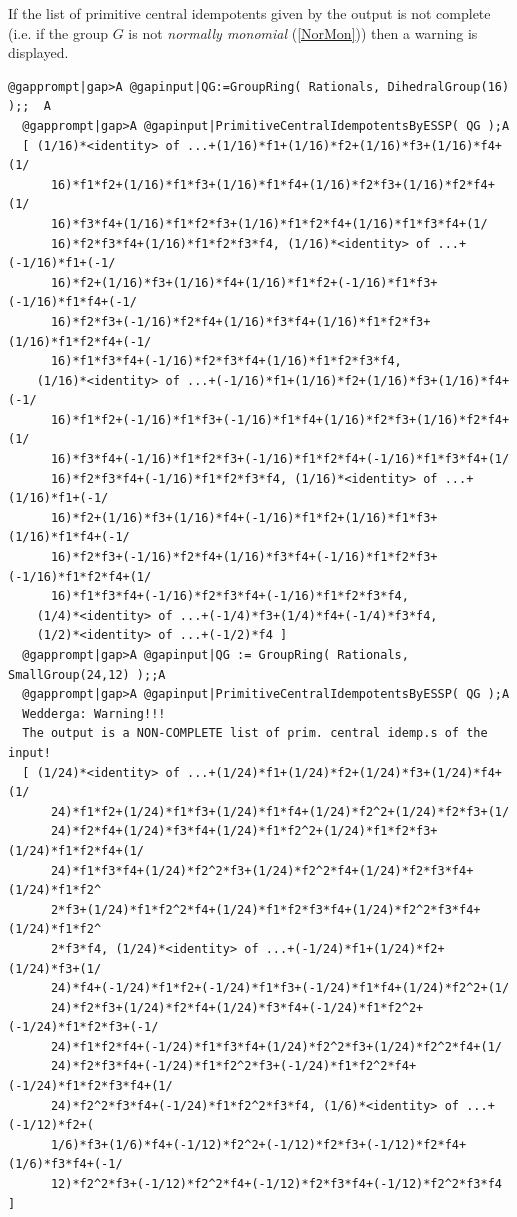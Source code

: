 \documentclass[a4paper,11pt]{report}
\begin{document}
{{{ If the list of primitive central idempotents given by the output is not
complete (i.e. if the group $G$ is not \emph{ normally monomial} (\ref{NorMon})) then a warning is displayed. 
\begin{Verbatim}[commandchars=@|A,fontsize=\small,frame=single,label=Example]
  @gapprompt|gap>A @gapinput|QG:=GroupRing( Rationals, DihedralGroup(16) );;  A
  @gapprompt|gap>A @gapinput|PrimitiveCentralIdempotentsByESSP( QG );A
  [ (1/16)*<identity> of ...+(1/16)*f1+(1/16)*f2+(1/16)*f3+(1/16)*f4+(1/
      16)*f1*f2+(1/16)*f1*f3+(1/16)*f1*f4+(1/16)*f2*f3+(1/16)*f2*f4+(1/
      16)*f3*f4+(1/16)*f1*f2*f3+(1/16)*f1*f2*f4+(1/16)*f1*f3*f4+(1/
      16)*f2*f3*f4+(1/16)*f1*f2*f3*f4, (1/16)*<identity> of ...+(-1/16)*f1+(-1/
      16)*f2+(1/16)*f3+(1/16)*f4+(1/16)*f1*f2+(-1/16)*f1*f3+(-1/16)*f1*f4+(-1/
      16)*f2*f3+(-1/16)*f2*f4+(1/16)*f3*f4+(1/16)*f1*f2*f3+(1/16)*f1*f2*f4+(-1/
      16)*f1*f3*f4+(-1/16)*f2*f3*f4+(1/16)*f1*f2*f3*f4, 
    (1/16)*<identity> of ...+(-1/16)*f1+(1/16)*f2+(1/16)*f3+(1/16)*f4+(-1/
      16)*f1*f2+(-1/16)*f1*f3+(-1/16)*f1*f4+(1/16)*f2*f3+(1/16)*f2*f4+(1/
      16)*f3*f4+(-1/16)*f1*f2*f3+(-1/16)*f1*f2*f4+(-1/16)*f1*f3*f4+(1/
      16)*f2*f3*f4+(-1/16)*f1*f2*f3*f4, (1/16)*<identity> of ...+(1/16)*f1+(-1/
      16)*f2+(1/16)*f3+(1/16)*f4+(-1/16)*f1*f2+(1/16)*f1*f3+(1/16)*f1*f4+(-1/
      16)*f2*f3+(-1/16)*f2*f4+(1/16)*f3*f4+(-1/16)*f1*f2*f3+(-1/16)*f1*f2*f4+(1/
      16)*f1*f3*f4+(-1/16)*f2*f3*f4+(-1/16)*f1*f2*f3*f4, 
    (1/4)*<identity> of ...+(-1/4)*f3+(1/4)*f4+(-1/4)*f3*f4, 
    (1/2)*<identity> of ...+(-1/2)*f4 ]
  @gapprompt|gap>A @gapinput|QG := GroupRing( Rationals, SmallGroup(24,12) );;A
  @gapprompt|gap>A @gapinput|PrimitiveCentralIdempotentsByESSP( QG );A
  Wedderga: Warning!!!
  The output is a NON-COMPLETE list of prim. central idemp.s of the input! 
  [ (1/24)*<identity> of ...+(1/24)*f1+(1/24)*f2+(1/24)*f3+(1/24)*f4+(1/
      24)*f1*f2+(1/24)*f1*f3+(1/24)*f1*f4+(1/24)*f2^2+(1/24)*f2*f3+(1/
      24)*f2*f4+(1/24)*f3*f4+(1/24)*f1*f2^2+(1/24)*f1*f2*f3+(1/24)*f1*f2*f4+(1/
      24)*f1*f3*f4+(1/24)*f2^2*f3+(1/24)*f2^2*f4+(1/24)*f2*f3*f4+(1/24)*f1*f2^
      2*f3+(1/24)*f1*f2^2*f4+(1/24)*f1*f2*f3*f4+(1/24)*f2^2*f3*f4+(1/24)*f1*f2^
      2*f3*f4, (1/24)*<identity> of ...+(-1/24)*f1+(1/24)*f2+(1/24)*f3+(1/
      24)*f4+(-1/24)*f1*f2+(-1/24)*f1*f3+(-1/24)*f1*f4+(1/24)*f2^2+(1/
      24)*f2*f3+(1/24)*f2*f4+(1/24)*f3*f4+(-1/24)*f1*f2^2+(-1/24)*f1*f2*f3+(-1/
      24)*f1*f2*f4+(-1/24)*f1*f3*f4+(1/24)*f2^2*f3+(1/24)*f2^2*f4+(1/
      24)*f2*f3*f4+(-1/24)*f1*f2^2*f3+(-1/24)*f1*f2^2*f4+(-1/24)*f1*f2*f3*f4+(1/
      24)*f2^2*f3*f4+(-1/24)*f1*f2^2*f3*f4, (1/6)*<identity> of ...+(-1/12)*f2+(
      1/6)*f3+(1/6)*f4+(-1/12)*f2^2+(-1/12)*f2*f3+(-1/12)*f2*f4+(1/6)*f3*f4+(-1/
      12)*f2^2*f3+(-1/12)*f2^2*f4+(-1/12)*f2*f3*f4+(-1/12)*f2^2*f3*f4 ]
\end{Verbatim}
 }

}}
\end{document}
